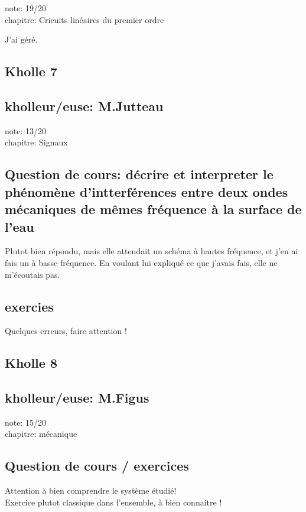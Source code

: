 \documentclass{article}
\begin{document}
note: 19/20 \\
chapitre: Cricuits linéaires du premier ordre

J'ai géré.


\subsection{Kholle 7}
\subsection{kholleur/euse: M.Jutteau}

note: 13/20 \\
chapitre: Signaux

\subsection{Question de cours: décrire et interpreter le phénomène d'intterférences entre deux ondes mécaniques de mêmes fréquence à la surface de l'eau}

Plutot bien répondu, mais elle attendait un schéma à hautes fréquence, et j'en ai fais un à basse fréquence. En voulant lui expliqué ce que j'avais fais, elle ne m'écoutais pas. \\

\subsection{exercies}

Quelques erreurs, faire attention !

\subsection{Kholle 8}
\subsection{kholleur/euse: M.Figus}

note: 15/20 \\
chapitre: mécanique

\subsection{Question de cours / exercices}

Attention à  bien comprendre le système étudié! \\

Exercice plutot classique dans l'ensemble, à bien connaitre ! \\
\end{document}
